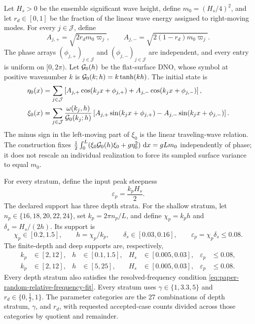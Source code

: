Let $H_s>0$ be the ensemble significant wave height, define
$m_0=(H_s/4)^2$, and let $r_d\in[0,1]$ be the fraction of the linear wave
energy assigned to right-moving modes.  For every $j\in\mathcal J$, define
\begin{equation}
  A_{j,+}=\sqrt{2r_d m_0\varpi_j},\qquad
  A_{j,-}=\sqrt{2(1-r_d)m_0\varpi_j}.
  \label{eq:paper-random-amplitudes}
\end{equation}
The phase arrays $(\phi_{j,+})_{j\in\mathcal J}$ and
$(\phi_{j,-})_{j\in\mathcal J}$ are independent, and every entry is uniform
on $[0,2\pi)$.  Let $\mathcal{G}_0(h)$ be the flat-surface DNO, whose symbol at positive
wavenumber $k$ is $\mathcal{G}_0(k;h)=k\tanh(kh)$.  The initial state is
\begin{align}
  \eta_0(x)
  &=
  \sum_{j\in\mathcal J}\left[
    A_{j,+}\cos(k_j x+\phi_{j,+})
    +A_{j,-}\cos(k_j x+\phi_{j,-})
  \right],
  \notag\\
  \xi_0(x)
  &=
  \sum_{j\in\mathcal J}
  \frac{\omega(k_j,h)}{\mathcal{G}_0(k_j;h)}
  \left[
    A_{j,+}\sin(k_j x+\phi_{j,+})
    -A_{j,-}\sin(k_j x+\phi_{j,-})
  \right].
  \label{eq:paper-random-state}
\end{align}
The minus sign in the left-moving part of $\xi_0$ is the linear
traveling-wave relation.  The construction fixes
$\frac12\int_0^L(\xi_0\mathcal{G}_0(h)\xi_0+g\eta_0^2)\,\,\mathrm{d} x=gLm_0$ independently
of phase; it does not rescale an individual realization to force its sampled
surface variance to equal $m_0$.

For every stratum, define the input peak steepness
\begin{equation}
  \varepsilon_p=\frac{k_pH_s}{2}.
  \label{eq:paper-random-peak-steepness}
\end{equation}
The declared support has three depth strata.  For the shallow stratum, let
$n_p\in\{16,18,20,22,24\}$, set $k_p=2\pi n_p/L$, and define
$\chi_p=k_p h$ and $\delta_s=H_s/(2h)$.  Its support is
\begin{equation}
  \chi_p\in[0.2,1.5],\qquad
  h=\chi_p/k_p,\qquad
  \delta_s\in[0.03,0.16],\qquad
  \varepsilon_p=\chi_p\delta_s\leq0.08.
  \label{eq:paper-random-shallow-support}
\end{equation}
The finite-depth and deep supports are, respectively,
\begin{align}
  k_p&\in[2,12],&
  h&\in[0.1,1.5],&
  H_s&\in[0.005,0.03],&
  \varepsilon_p&\leq0.08,
  \label{eq:paper-random-finite-support}\\
  k_p&\in[2,12],&
  h&\in[5,25],&
  H_s&\in[0.005,0.03],&
  \varepsilon_p&\leq0.08.
  \label{eq:paper-random-deep-support}
\end{align}
Every depth stratum also satisfies the resolved-frequency condition
\cref{eq:paper-random-relative-frequency-fit}.
Every stratum uses
$\gamma\in\{1,3.3,5\}$ and $r_d\in\{0,\tfrac12,1\}$.  The
parameter categories are the 27 combinations of depth stratum, $\gamma$, and
$r_d$, with requested accepted-case counts divided across those categories by
quotient and remainder.


